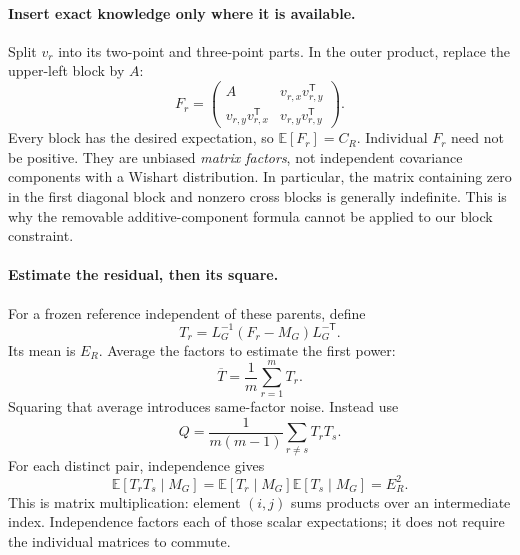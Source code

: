 \documentclass[11pt]{article}
\newcommand{\E}{\mathbb{E}}
\begin{document}
\paragraph{Insert exact knowledge only where it is available.}
Split $v_r$ into its two-point and three-point parts. In the outer product,
replace the upper-left block by $A$:
\begin{equation}
 F_r=\begin{pmatrix}
 A&v_{r,x}v_{r,y}^{\mathsf T}\\
 v_{r,y}v_{r,x}^{\mathsf T}&v_{r,y}v_{r,y}^{\mathsf T}
 \end{pmatrix}.
\end{equation}
Every block has the desired expectation, so $\E[F_r]=C_R$. Individual
$F_r$ need not be positive. They are unbiased \emph{matrix factors}, not
independent covariance components with a Wishart distribution. In
particular, the matrix containing zero in the first diagonal block and
nonzero cross blocks is generally indefinite. This is why the removable
additive-component formula cannot be applied to our block constraint.

\paragraph{Estimate the residual, then its square.}
For a frozen reference independent of these parents, define
\begin{equation}
 T_r=L_G^{-1}(F_r-M_G)L_G^{-\mathsf T}.
\end{equation}
Its mean is $E_R$. Average the factors to estimate the first power:
\begin{equation}
 \overline T=\frac{1}{m}\sum_{r=1}^{m}T_r.
\end{equation}
Squaring that average introduces same-factor noise. Instead use
\begin{equation}
 Q=\frac{1}{m(m-1)}\sum_{r\ne s}T_rT_s.
 \label{eq:two-stage-q}
\end{equation}
For each distinct pair, independence gives
\begin{equation}
 \E[T_rT_s\mid M_G]
 =\E[T_r\mid M_G]\E[T_s\mid M_G]=E_R^2.
\end{equation}
This is matrix multiplication: element $(i,j)$ sums products over an
intermediate index. Independence factors each of those scalar expectations;
it does not require the individual matrices to commute.
\end{document}
